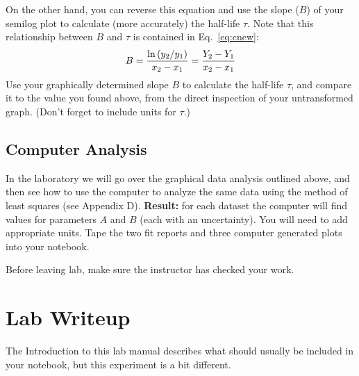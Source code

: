 \begin{enumerate}
On the other hand, you can reverse this equation and use the slope ($B$) of your semilog plot
to calculate (more accurately) the half-life $\tau$.
Note that this relationship between  $B$ and $\tau$ is contained
in Eq.~\ref{eq:cnew}:
\begin{equation}
B = 
{\ln\left(y_{2}/y_{1}\right) \over x_{2} - x_{1}} =
{Y_{2}-Y_{1} \over x_{2} - x_{1}}
\end{equation}
Use your graphically determined slope $B$ to calculate the half-life $\tau$, and compare it to the value
you found above, from the direct inspection of your untransformed graph. (Don't forget
to include units for $\tau$.)

\end{enumerate}
\subsection*{Computer Analysis}
    In the laboratory we will go over the graphical data analysis
outlined above, and then see how to use the computer to analyze
the same data using the method of least squares (see Appendix D).
{\bf Result:} for each dataset the computer will find values for
parameters $A$  and $B$ (each with an uncertainty).  You will need to
add appropriate units.  Tape the two fit reports and three computer
generated plots into your notebook.



    Before leaving lab, make sure the instructor has checked your
work.

\section*{Lab Writeup}

The Introduction to this lab manual describes what should
usually be included in your notebook, but this experiment is
a bit different.


